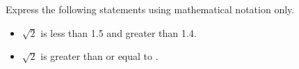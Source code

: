 Express the following statements using mathematical notation only.

\begin{itemize}
\item $\sqrt{2}$ is less than 1.5 and greater than 1.4.
\item $\sqrt{2}$ is greater than or equal to .
\end{itemize}

